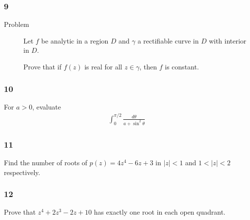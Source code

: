 \hypertarget{section-76}{%
\subsubsection{9}\label{section-76}}

\begin{description}
\item[Problem]
Let \(f\) be analytic in a region \(D\) and \(\gamma\) a rectifiable
curve in \(D\) with interior in \(D\).

Prove that if \(f(z)\) is real for all \(z\in \gamma\), then \(f\) is
constant.
\end{description}

\hypertarget{section-77}{%
\subsubsection{10}\label{section-77}}

\begin{description}
\tightlist
\item[Problem]
For \(a> 0\), evaluate
\begin{align*}
  \int_0^{\pi/2} \frac{d\theta}{a + \sin^2 \theta}
  \end{align*}
\end{description}

\hypertarget{section-78}{%
\subsubsection{11}\label{section-78}}

\begin{description}
\tightlist
\item[Problem]
Find the number of roots of \(p(z) = 4z^4 - 6z + 3\) in
\({\left\lvert {z} \right\rvert} < 1\) and
\(1 < {\left\lvert {z} \right\rvert} < 2\) respectively.
\end{description}

\hypertarget{section-79}{%
\subsubsection{12}\label{section-79}}

\begin{description}
\tightlist
\item[Problem]
Prove that \(z^4 + 2z^3 -2z + 10\) has exactly one root in each open
quadrant.
\end{description}

